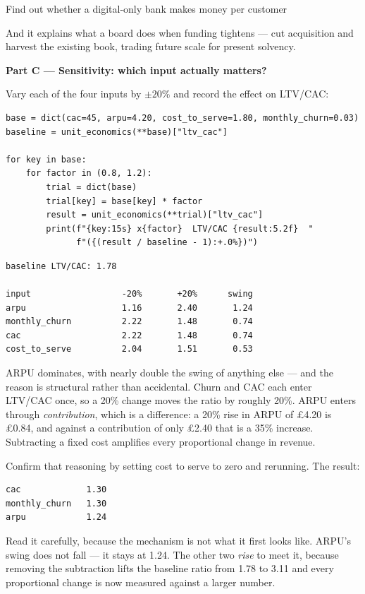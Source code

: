 \begin{labproject}{Find out whether a digital-only bank makes money per customer}
\begin{keyidea}
And it explains what a board does when funding tightens --- cut acquisition and harvest the existing book, trading future scale for present solvency.
\end{keyidea}

\medskip\noindent\textbf{Part C --- Sensitivity: which input actually matters?}\par
Vary each of the four inputs by $\pm 20\%$ and record the effect on LTV/CAC:

\begin{lstlisting}[style=utppython]
base = dict(cac=45, arpu=4.20, cost_to_serve=1.80, monthly_churn=0.03)
baseline = unit_economics(**base)["ltv_cac"]

for key in base:
    for factor in (0.8, 1.2):
        trial = dict(base)
        trial[key] = base[key] * factor
        result = unit_economics(**trial)["ltv_cac"]
        print(f"{key:15s} x{factor}  LTV/CAC {result:5.2f}  "
              f"({(result / baseline - 1):+.0%})")
\end{lstlisting}

\begin{lstlisting}[style=utpterminal]
baseline LTV/CAC: 1.78

input                  -20%       +20%      swing
arpu                   1.16       2.40       1.24
monthly_churn          2.22       1.48       0.74
cac                    2.22       1.48       0.74
cost_to_serve          2.04       1.51       0.53
\end{lstlisting}

ARPU dominates, with nearly double the swing of anything else --- and the reason is structural rather than accidental. Churn and CAC each enter LTV/CAC once, so a 20\% change moves the ratio by roughly 20\%. ARPU enters through \emph{contribution}, which is a difference: a 20\% rise in ARPU of \pounds4.20 is \pounds0.84, and against a contribution of only \pounds2.40 that is a 35\% increase. Subtracting a fixed cost amplifies every proportional change in revenue.

\begin{tryit}
Confirm that reasoning by setting cost to serve to zero and rerunning. The result:

\begin{lstlisting}[style=utpterminal]
cac             1.30
monthly_churn   1.30
arpu            1.24
\end{lstlisting}

Read it carefully, because the mechanism is not what it first looks like. ARPU's swing does not fall --- it stays at 1.24. The other two \emph{rise} to meet it, because removing the subtraction lifts the baseline ratio from 1.78 to 3.11 and every proportional change is now measured against a larger number.


\end{tryit}
\end{labproject}
